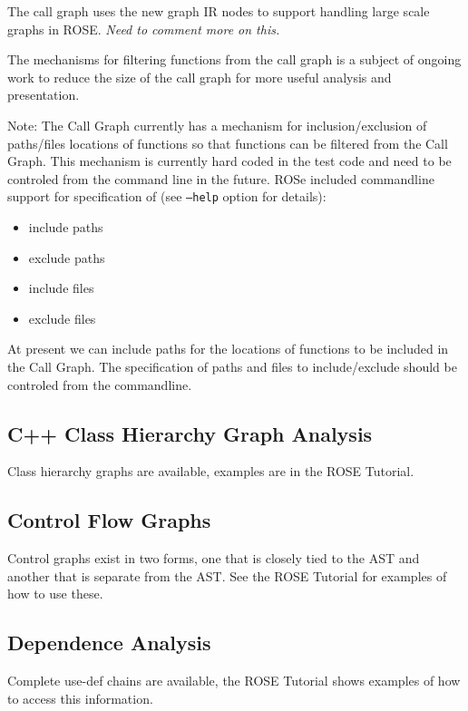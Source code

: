    The call graph uses the new graph IR nodes to support handling large scale 
graphs in ROSE. {\em Need to comment more on this.}

   The mechanisms for filtering functions from the call graph is a subject
of ongoing work to reduce the size of the call graph for more useful analysis
and presentation.

Note:  The Call Graph currently has a mechanism for inclusion/exclusion of
paths/files locations of functions so that functions can be filtered from the
Call Graph.  This mechanism is currently hard coded in the test code and need
to be controled from the command line in the future.  ROSe included commandline
support for specification of (see {\tt --help} option for details):
\begin{itemize}
   \item include paths
   \item exclude paths
   \item include files
   \item exclude files
\end{itemize}

At present we can include paths for 
the locations of functions to be included in the Call Graph. The specification of
paths and files to include/exclude should be controled from the commandline.


\subsection{C++ Class Hierarchy Graph Analysis}

   Class hierarchy graphs are available, examples are in the
ROSE Tutorial.

\subsection{Control Flow Graphs}

   Control graphs exist in two forms, one that is closely tied to
the AST and another that is separate from the AST.  See the ROSE
Tutorial for examples of how to use these.

\subsection{Dependence Analysis}

   Complete use-def chains are available, the ROSE Tutorial shows examples of
how to access this information.

